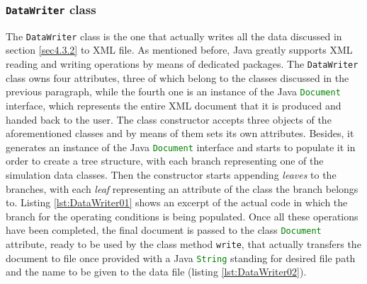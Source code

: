 \subsubsection{\texttt{DataWriter} class}

The \lstinline[language=Java]!DataWriter! class is the one that actually writes all the data discussed in section \ref{sec4.3.2} to XML file. As mentioned before, Java greatly supports XML reading and writing operations by means of dedicated packages. The \lstinline[language=Java]!DataWriter! class owns four attributes, three of which belong to the classes discussed in the previous paragraph, while the fourth one is an instance of the Java \lstinline[language=Java]!Document! interface, which represents the entire XML document that it is produced and handed back to the user. The class constructor accepts three objects of the aforementioned classes and by means of them sets its own attributes. Besides, it generates an instance of the Java \lstinline[language=Java]!Document! interface and starts to populate it in order to create a tree structure, with each branch representing one of the simulation data classes. Then the constructor starts appending \emph{leaves} to the branches, with each \emph{leaf} representing an attribute of the class the branch belongs to. Listing \ref{lst:DataWriter01} shows an excerpt of the actual code in which the branch for the operating conditions is being populated. Once all these operations have been completed, the final document is passed to the class \lstinline[language=Java]!Document! attribute, ready to be used by the class method \lstinline[language=Java]!write!, that actually transfers the document to file once provided with a Java \lstinline[language=Java]!String! standing for desired file path and the name to be given to the data file (listing \ref{lst:DataWriter02}).
% 
\bigskip
